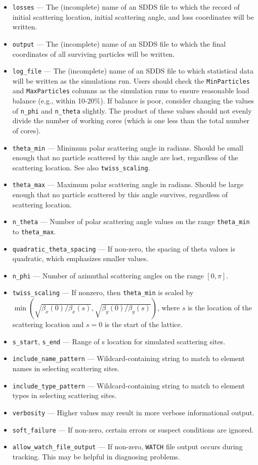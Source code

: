 \documentclass[11pt]{article}
\begin{document}
\begin{itemize}
\item \verb|losses| --- The (incomplete) name of an SDDS file to which the record of initial scattering location,
  initial scattering angle, and loss coordinates will be written.
\item \verb|output| --- The (incomplete) name of an SDDS file to which the final coordinates of all surviving particles
  will be written.
\item \verb|log_file| --- The (incomplete) name of an SDDS file to which statistical data will be written as the simulations
  run. Users should check the \verb|MinParticles| and \verb|MaxParticles| columns as the simulation runs to ensure
  reasonable load balance (e.g., within 10-20\%). If balance is poor, consider changing the values of \verb|n_phi| and
  \verb|n_theta| slightly. The product of these values should not evenly divide the number of working cores (which is
  one less than the total number of cores).
\item \verb|theta_min| --- Minimum polar scattering angle in radians. Should be small enough that no particle scattered
  by this angle are lost, regardless of the scattering location. See also \verb|twiss_scaling|.
\item \verb|theta_max| --- Maximum polar scattering angle in radians. Should be large enough that no particle scattered
  by this angle survives, regardless of scattering location. 
\item \verb|n_theta| --- Number of polar scattering angle values on the range \verb|theta_min| to \verb|theta_max|.
\item \verb|quadratic_theta_spacing| --- If non-zero, the spacing of theta values is quadratic, which emphasizes smaller values.
\item \verb|n_phi| --- Number of azimuthal scattering angles on the range $[0, \pi]$.
\item \verb|twiss_scaling| --- If nonzero, then \verb|theta_min| is scaled by 
  $\min (\sqrt{\beta_x(0)/\beta_x(s)}, \sqrt{\beta_y(0)/\beta_y(s)})$,
  where $s$ is the location of the scattering location and $s=0$ is the start of the lattice.
\item \verb|s_start|, \verb|s_end| --- Range of s location for simulated scattering sites.
\item \verb|include_name_pattern| --- Wildcard-containing string to match to element names in selecting scattering sites.
\item \verb|include_type_pattern| --- Wildcard-containing string to match to element types in selecting scattering sites.
\item \verb|verbosity| --- Higher values may result in more verbose informational output.
\item \verb|soft_failure| --- If non-zero, certain errors or suspect conditions are ignored.
\item \verb|allow_watch_file_output| --- If non-zero, \verb|WATCH| file output occurs during tracking. This may be helpful
  in diagnosing problems.
\end{itemize}
\end{document}
